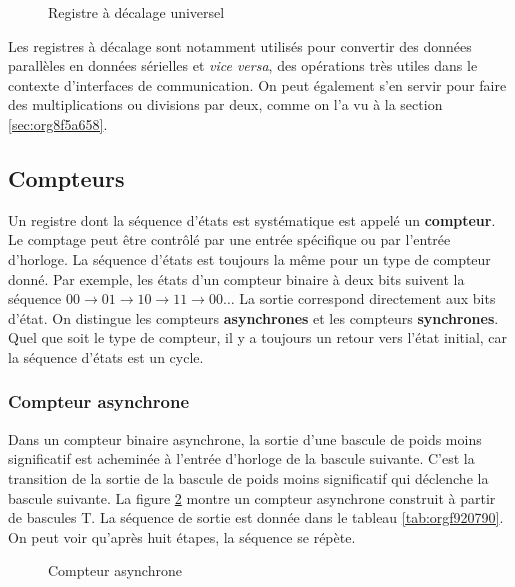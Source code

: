 \documentclass[11pt]{article}
\begin{document}
\begin{figure}[htbp]
\centering

\caption{\label{fig:orgf987da8}Registre à décalage universel}
\end{figure} 

Les registres à décalage sont notamment utilisés pour convertir des
données parallèles en données sérielles et \emph{vice versa}, des opérations
très utiles dans le contexte d'interfaces de communication. On peut
également s'en servir pour faire des multiplications ou divisions par
deux, comme on l'a vu à la section \ref{sec:org8f5a658}.

\subsection{Compteurs}
\label{sec:org6fb9c3b}

Un registre dont la séquence d'états est systématique est appelé un
\textbf{compteur}. Le comptage peut être contrôlé par une entrée spécifique
ou par l'entrée d'horloge. La séquence d'états est toujours la même
pour un type de compteur donné. Par exemple, les états d'un compteur
binaire à deux bits suivent la séquence \(00 \rightarrow 01
\rightarrow 10 \rightarrow 11 \rightarrow 00 \ldots\) La sortie
correspond directement aux bits d'état. On distingue les compteurs
\textbf{asynchrones} et les compteurs \textbf{synchrones}. Quel que soit le type de
compteur, il y a toujours un retour vers l'état initial, car la
séquence d'états est un cycle.

\subsubsection{Compteur asynchrone}
\label{sec:org5e67096}

Dans un compteur binaire asynchrone, la sortie d'une bascule de poids
moins significatif est acheminée à l'entrée d'horloge de la bascule
suivante. C'est la transition de la sortie de la bascule de poids
moins significatif qui déclenche la bascule suivante. La figure
\ref{fig:org1ba44e0} montre un compteur asynchrone construit à partir de
bascules T. La séquence de sortie est donnée dans le tableau
\ref{tab:orgf920790}. On peut voir qu'après huit étapes, la séquence se
répète.

\begin{figure}[htbp]
\centering

\caption{\label{fig:org1ba44e0}Compteur asynchrone}
\end{figure}
\end{document}
